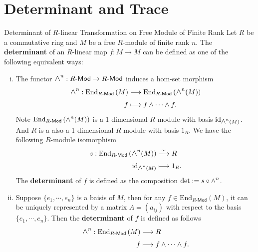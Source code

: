 \section{Determinant and Trace}



\begin{definition}{Determinant of $R$-linear Transformation on Free Module of Finite Rank}{}
    Let $R$ be a commutative ring and $M$ be a free $R$-module of finite rank $n$. The \textbf{determinant} of an $R$-linear map $f:M\to M$ can be defined as one of the following equivalent ways:
    \begin{enumerate}[(i)]
        \item The functor $\Largewedge^n:R\text{-}\mathsf{Mod}\to R\text{-}\mathsf{Mod}$ induces a hom-set morphism 
        \begin{align*}
            \largewedge^n:\mathrm{End}_{R\text{-}\mathsf{Mod}}\left(M\right) &\longrightarrow\mathrm{End}_{R\text{-}\mathsf{Mod}}\left(\largewedge^n(M)\right)\\
        f &\longmapsto f\wedge\cdots\wedge f.
        \end{align*}
        Note $\mathrm{End}_{R\text{-}\mathsf{Mod}}\left(\largewedge^n(M)\right)$ is a 1-dimensional $R$-module with basis $\mathrm{id}_{\largewedge^n(M)}$. And $R$ is a also a 1-dimensional $R$-module with basis $1_R$. We have the following $R$-module isomorphism
        \begin{align*}
            s:\mathrm{End}_{R\text{-}\mathsf{Mod}}\left(\largewedge^n(M)\right)&\xlongrightarrow{\sim} R\\
            \mathrm{id}_{\largewedge^n(M)} &\longmapsto 1_R.
        \end{align*}
        The \textbf{determinant} of $f$ is defined as the composition $\det:=s\circ \largewedge^n$.
        \item Suppose $\{e_1,\cdots,e_n\}$ is a baisis of $M$, then for any $f\in \mathrm{End}_{R\text{-}\mathsf{Mod}}\left(M\right)$, it can be uniquely represented by a matrix $A=(a_{ij})$ with respect to the basis $\{e_1,\cdots,e_n\}$. Then the \textbf{determinant} of $f$ is defined as follows
        \begin{align*}
            \largewedge^n:\mathrm{End}_{R\text{-}\mathsf{Mod}}\left(M\right) &\longrightarrow R\\
        f &\longmapsto f\wedge\cdots\wedge f.
        \end{align*}
    \end{enumerate}
\end{definition}




